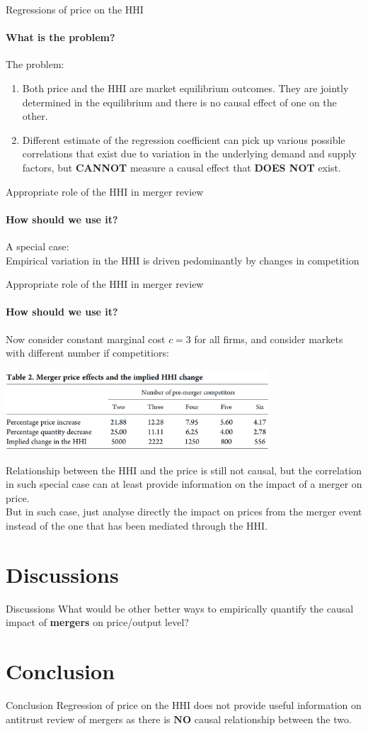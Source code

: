 \documentclass{beamer}
\begin{document}
\begin{frame}{Regressions of price on the HHI}
\framesubtitle{What is the problem?}
The problem:
\begin{enumerate}
\item Both price and the HHI are market equilibrium outcomes. They are jointly determined in the equilibrium and there is no causal effect of one on the other.
\item Different estimate of the regression coefficient can pick up various possible correlations that exist due to variation in the underlying demand and supply factors, but \textbf{CANNOT} measure a causal effect that \textbf{DOES NOT} exist.
\end{enumerate}
\end{frame}

\begin{frame}{Appropriate role of the HHI in merger review}
\framesubtitle{How should we use it?}
A special case: \\
Empirical variation in the HHI is driven pedominantly by changes in competition
\end{frame}

\begin{frame}{Appropriate role of the HHI in merger review}
\framesubtitle{How should we use it?}
Now consider constant marginal cost $c = 3$ for all firms, and consider markets with different number if competitiors:
\begin{center}
\includegraphics[height=3cm]{Tab2}
\end{center}
Relationship between the HHI and the price is still not causal, but the correlation in such special case can at least provide information on the impact of a merger on price.\\
\hfill \break
But in such case, just analyse directly the impact on prices from the merger event instead of the one that has been mediated through the HHI.
\end{frame}

\section{Discussions}
\begin{frame}{Discussions}
What would be other better ways to empirically quantify the  causal impact of \textbf{mergers} on price/output level?
\end{frame}

\section{Conclusion}
\begin{frame}{Conclusion}
Regression of price on the HHI does not provide useful information on antitrust review of mergers as there is $\textbf{NO}$ causal relationship between the two.
\end{frame}
\end{document}
